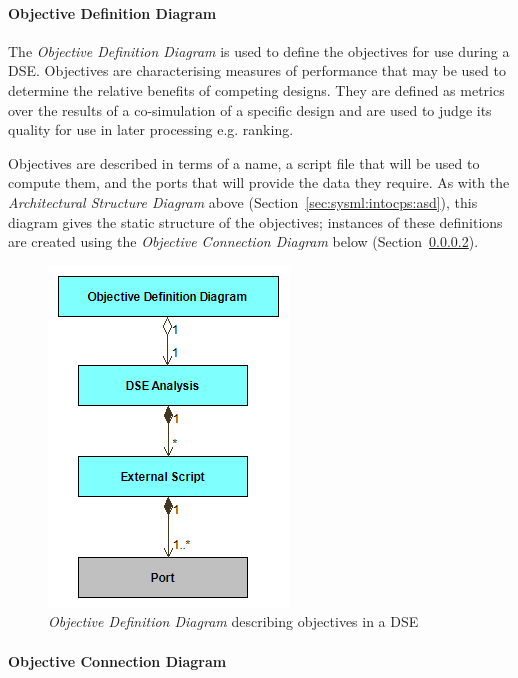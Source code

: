 \paragraph{Objective Definition Diagram}
\label{sec:sysml:dse:odd}

The \emph{Objective Definition Diagram} is used to define the objectives for use during a DSE. Objectives are characterising measures of performance that may be used to determine the relative benefits of competing designs. They are defined as metrics over the results of a co-simulation of a specific design and are used to judge its quality for use in later processing e.g. ranking.

Objectives are described in terms of a name, a script file that will be used to compute them, and the ports that will provide the data they require. As with the \emph{Architectural Structure Diagram} above (Section~\ref{sec:sysml:intocps:asd}), this diagram gives the static structure of the objectives; instances of these definitions are created using the \emph{Objective Connection Diagram} below (Section~\ref{sec:sysml:dse:ocd}).

\begin{figure}[h!]
\centering
\includegraphics[scale=0.5]{figures/DSE/ObjectiveDefinitionView}
\caption{\emph{Objective Definition Diagram} describing objectives in a DSE}
\label{fig:sysml:sysml:dse:odd}
\end{figure}

\paragraph{Objective Connection Diagram}
\label{sec:sysml:dse:ocd}

